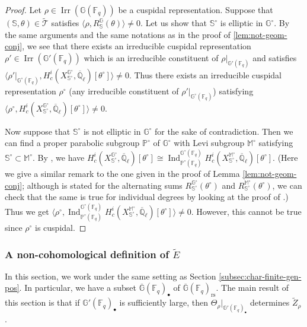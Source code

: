 \documentclass{amsart}
\newcommand{\rs}{\mathrm{rs}}
\newcommand{\cT}{\mathcal{T}}
\newcommand{\F}{\mathbb{F}}
\newcommand{\FF}{\mathbb{F}}
\newcommand{\Q}{\mathbb{Q}}
\newcommand{\bbS}{\mathbb{S}}
\newcommand{\bbG}{\mathbb{G}}
\DeclareMathOperator{\Ind}{Ind}
\DeclareMathOperator{\Irr}{Irr}
\theoremstyle{plain}
\theoremstyle{definition}
\theoremstyle{remark}
\theoremstyle{theorem}
\begin{document}
\begin{proof}
Let $\rho\in\Irr(\bbG(\FF_q))$ be a cuspidal representation.
Suppose that $(\bbS,\theta) \in \tilde{\cT}$ satisfies $\langle\rho,R_{\bbS}^{\bbG}(\theta)\rangle\neq0$.
Let us show that $\bbS^{\circ}$ is elliptic in $\bbG^{\circ}$.
By the same arguments and the same notations as in the proof of \ref{lem:not-geom-conj}, we see that there exists an irreducible cuspidal representation $\rho'\in\Irr(\bbG'(\FF_q))$ which is an irreducible constituent of $\rho|_{\bbG'(\FF_q)}$ and satisfies $\langle \rho'|_{\bbG^{\circ}(\F_{q})}, H_{c}^{i}(X^{\bbG^{\circ}}_{\bbS^{\circ}},\overline{\Q}_{\ell})[\theta^{\circ}] \rangle \neq 0$.
Thus there exists an irreducible cuspidal representation $\rho^{\circ}$ (any irreducible constituent of $\rho'|_{\bbG^{\circ}(\F_{q})}$) satisfying $\langle \rho^{\circ}, H_{c}^{i}(X^{\bbG^{\circ}}_{\bbS^{\circ}},\overline{\Q}_{\ell})[\theta^{\circ}] \rangle \neq 0$.

Now suppose that $\bbS^{\circ}$ is not elliptic in $\bbG^{\circ}$ for the sake of contradiction.
Then we can find a proper parabolic subgroup $\mathbb{P}^{\circ}$ of $\bbG^{\circ}$ with Levi subgroup $\mathbb{M}^{\circ}$ satisfying $\bbS^{\circ}\subset\mathbb{M}^{\circ}$.
By \cite[Proposition 8.2]{DL76}, we have $H_{c}^{i}(X^{\bbG^{\circ}}_{\bbS^{\circ}},\overline{\Q}_{\ell})[\theta^{\circ}]\cong \Ind_{\mathbb{P}^{\circ}(\F_{q})}^{\bbG^{\circ}(\F_{q})}H_{c}^{i}(X^{\mathbb{M}^{\circ}}_{\bbS^{\circ}},\overline{\Q}_{\ell})[\theta^{\circ}]$.
(Here we give a similar remark to the one given in the proof of Lemma \ref{lem:not-geom-conj}; although \cite[Proposition 8.2]{DL76} is stated for the alternating sums $R_{\bbS^{\circ}}^{\bbG^{\circ}}(\theta^{\circ})$ and $R_{\bbS^{\circ}}^{\mathbb{M}^{\circ}}(\theta^{\circ})$, we can check that the same is true for individual degrees by looking at the proof of \cite[Proposition 8.2]{DL76}.)
Thus we get $\langle \rho^{\circ}, \Ind_{\mathbb{P}^{\circ}(\F_{q})}^{\bbG^{\circ}(\F_{q})}H_{c}^{i}(X^{\mathbb{M}^{\circ}}_{\bbS^{\circ}},\overline{\Q}_{\ell})[\theta^{\circ}] \rangle \neq 0$.
However, this cannot be true since $\rho^{\circ}$ is cuspidal.
\end{proof}

\subsubsection{A non-cohomological definition of $\tilde E$}

In this section, we work under the same setting as Section \ref{subsec:char-finite-gen-pos}.
In particular, we have a subset $\overline{\bbG}(\FF_q)_\bullet$ of $\overline{\bbG}(\FF_q)_{\rs}$.
The main result of this section is that if $\bbG'(\FF_q)_\bullet$ is sufficiently large, then $\Theta_\rho|_{\bbG'(\FF_q)_\bullet}$ determines $\tilde Z_\rho$.
\end{document}
